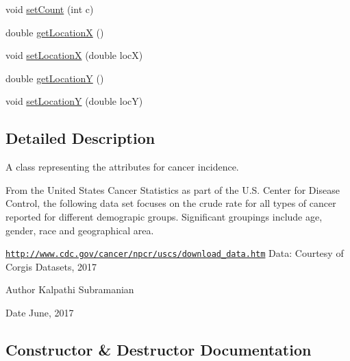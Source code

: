 \begin{DoxyCompactItemize}
\item 
void \mbox{\hyperlink{classbridges_1_1_cancer_incidence_a5fd30ffcf94f61cbca49112332ae4e94}{set\+Count}} (int c)
\item 
double \mbox{\hyperlink{classbridges_1_1_cancer_incidence_ab71ad6680a1d432fef9919939e66d8e3}{get\+LocationX}} ()
\item 
void \mbox{\hyperlink{classbridges_1_1_cancer_incidence_a6f7ec674c626e932378f01e08178d1fb}{set\+LocationX}} (double locX)
\item 
double \mbox{\hyperlink{classbridges_1_1_cancer_incidence_a2a1424abd357e5967eda190a08abb2d1}{get\+LocationY}} ()
\item 
void \mbox{\hyperlink{classbridges_1_1_cancer_incidence_a8ca0a21c2c5153b11adf6712e6648579}{set\+LocationY}} (double locY)
\end{DoxyCompactItemize}


\subsection{Detailed Description}
A class representing the attributes for cancer incidence. 

From the United States Cancer Statistics as part of the U.\+S. Center for Disease Control, the following data set focuses on the crude rate for all types of cancer reported for different demograpic groups. Significant groupings include age, gender, race and geographical area.

\href{http://www.cdc.gov/cancer/npcr/uscs/download_data.htm}{\tt http\+://www.\+cdc.\+gov/cancer/npcr/uscs/download\+\_\+data.\+htm} Data\+: Courtesy of Corgis Datasets, 2017

\begin{DoxyAuthor}{Author}
Kalpathi Subramanian 
\end{DoxyAuthor}
\begin{DoxyDate}{Date}
June, 2017 
\end{DoxyDate}


\subsection{Constructor \& Destructor Documentation}
\mbox{\label{classbridges_1_1_cancer_incidence_a3f5bb34394a22169bb4465c07e50fba1}} 
